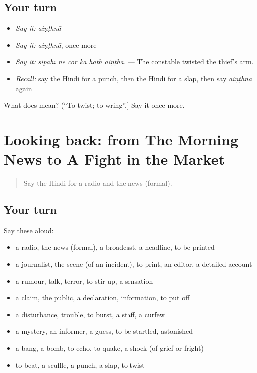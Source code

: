 \subsection*{Your turn}
\begin{itemize}
\raggedright
  \item \emph{Say it:} \emph{aiṇṭhnā}
  \item \emph{Say it:} \emph{aiṇṭhnā}, once more
  \item \emph{Say it:} \emph{sipāhī ne cor kā hāth aiṇṭhā.} — The constable twisted the thief's arm.
  \item \emph{Recall:} say the Hindi for a punch, then the Hindi for a slap, then say \emph{aiṇṭhnā} again
\end{itemize}

\begin{tcolorbox}[breakable,colback=teal!4,colframe=teal!35!black,title={Before you move on}]
What does  mean? (\textquotedblleft{}To twist; to wring\textquotedblright{}.) Say it once more.
\end{tcolorbox}
\section[(dialogue)]{Looking back: from The Morning News to A Fight in the Market}

\label{lesson:HI-R319-review-312-319}



\begin{quote}
Say the Hindi for a radio and the news (formal).
\end{quote}

\subsection*{Your turn}
Say these aloud:

\begin{itemize}
\raggedright
  \item a radio, the news (formal), a broadcast, a headline, to be printed
  \item a journalist, the scene (of an incident), to print, an editor, a detailed account
  \item a rumour, talk, terror, to stir up, a sensation
  \item a claim, the public, a declaration, information, to put off
  \item a disturbance, trouble, to burst, a staff, a curfew
  \item a mystery, an informer, a guess, to be startled, astonished
  \item a bang, a bomb, to echo, to quake, a shock (of grief or fright)
  \item to beat, a scuffle, a punch, a slap, to twist
\end{itemize}

